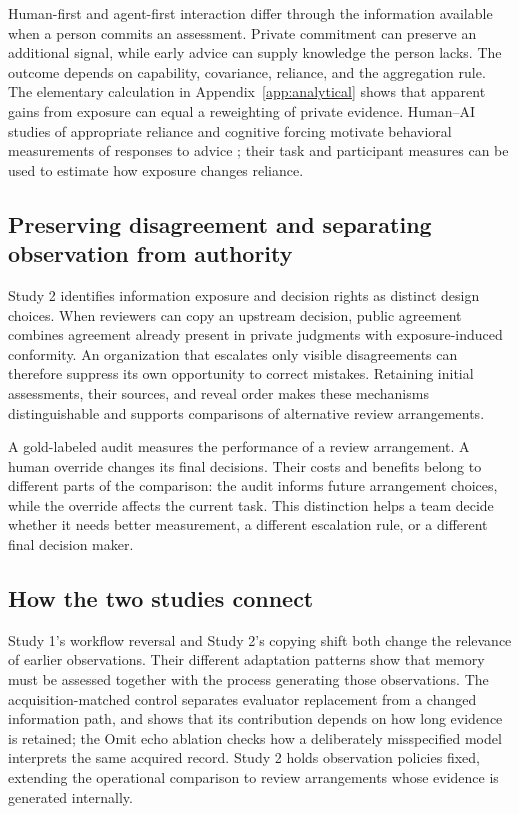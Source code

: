 Human-first and agent-first interaction differ through the information available when a person commits an assessment. Private commitment can preserve an additional signal, while early advice can supply knowledge the person lacks. The outcome depends on capability, covariance, reliance, and the aggregation rule. The elementary calculation in Appendix~\ref{app:analytical} shows that apparent gains from exposure can equal a reweighting of private evidence. Human--AI studies of appropriate reliance and cognitive forcing motivate behavioral measurements of responses to advice \citep{lee,bansal,bucinca}; their task and participant measures can be used to estimate how exposure changes reliance.

\subsection{Preserving disagreement and separating observation from authority}

Study 2 identifies information exposure and decision rights as distinct design choices. When reviewers can copy an upstream decision, public agreement combines agreement already present in private judgments with exposure-induced conformity. An organization that escalates only visible disagreements can therefore suppress its own opportunity to correct mistakes. Retaining initial assessments, their sources, and reveal order makes these mechanisms distinguishable and supports comparisons of alternative review arrangements.

A gold-labeled audit measures the performance of a review arrangement. A human override changes its final decisions. Their costs and benefits belong to different parts of the comparison: the audit informs future arrangement choices, while the override affects the current task. This distinction helps a team decide whether it needs better measurement, a different escalation rule, or a different final decision maker.

\subsection{How the two studies connect}
\label{sec:study-connections}
Study 1's workflow reversal and Study 2's copying shift both change the relevance of earlier observations. Their different adaptation patterns show that memory must be assessed together with the process generating those observations. The acquisition-matched control separates evaluator replacement from a changed information path, and shows that its contribution depends on how long evidence is retained; the Omit echo ablation checks how a deliberately misspecified model interprets the same acquired record. Study 2 holds observation policies fixed, extending the operational comparison to review arrangements whose evidence is generated internally.

